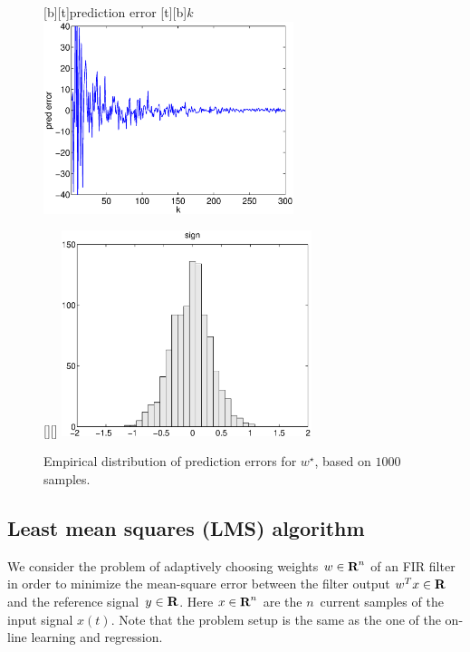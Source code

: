 \documentclass[12pt]{article}
\begin{document}
\begin{figure}
\begin{center}
[b][t]{prediction error}
[t][b]{$k$}
\includegraphics[width=0.65\textwidth]{matlab/online_reg_errors}
\end{center}
\caption{Prediction error $w^{(k)T}x^{(k+1)}-y^{(k+1)}$
versus iteration number $k$.}
\label{f-online-reg-errors}
%
\begin{center}
[][]{}
\includegraphics[width=0.65\textwidth]{matlab/online_reg_dist}
\end{center}
\caption{Empirical distribution of prediction errors
for $w^\star$, based on $1000$ samples.}
\label{f-online-reg-dist}
\end{figure}

\iffalse
\subsection{Least mean squares (LMS) algorithm}

We consider the problem of adaptively choosing weights
$w \in {\mbox{\bf R}}^n$ of an FIR filter in order to minimize
the mean-square error between the filter output
$w^T x \in {\mbox{\bf R}}$ and the reference signal~$y \in {\mbox{\bf R}}$.
Here $x\in{\mbox{\bf R}}^n$ are the $n$~current samples of the input
signal $x(t)$. Note that the problem setup is the same
as the one of the on-line learning and regression.
\end{document}
